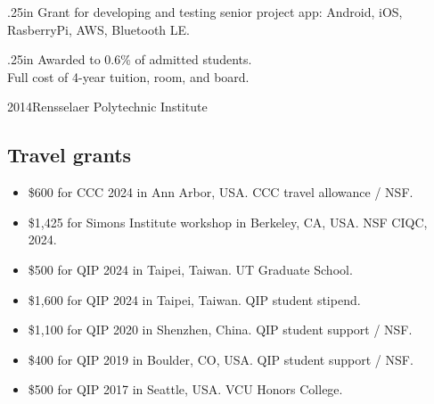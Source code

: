 \documentclass[11pt,letterpaper,serif]{moderncv}
\begin{document}

{
\begin{adjustwidth}{.25in}{}
	Grant for developing and testing senior project app: Android, iOS, RasberryPi, AWS, Bluetooth LE.
\end{adjustwidth}
}

{
\begin{adjustwidth}{.25in}{}
	Awarded to 0.6\% of admitted students.\\
	Full cost of 4-year tuition, room, and board.
\end{adjustwidth}
}


 {2014}{Rensselaer Polytechnic Institute}{}

\smallskip
\subsection{Travel grants}

\begin{itemize}
	\item \$600 for CCC 2024 in Ann Arbor, USA. CCC travel allowance / NSF.
	\item \$1,425 for Simons Institute workshop in Berkeley, CA, USA. NSF CIQC, 2024.
	\item \$500 for QIP 2024 in Taipei, Taiwan. UT Graduate School.
	\item \$1,600 for QIP 2024 in Taipei, Taiwan. QIP student stipend.
	\item \$1,100 for QIP 2020 in Shenzhen, China. QIP student support / NSF.
	\item \$400 for QIP 2019 in Boulder, CO, USA. QIP student support / NSF.
	\item \$500 for QIP 2017 in Seattle, USA. VCU Honors College.
\end{itemize}

\end{document}
